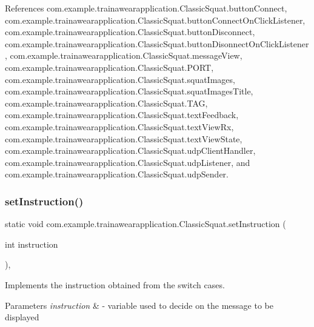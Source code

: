 References com.\+example.\+trainawearapplication.\+Classic\+Squat.\+button\+Connect, com.\+example.\+trainawearapplication.\+Classic\+Squat.\+button\+Connect\+On\+Click\+Listener, com.\+example.\+trainawearapplication.\+Classic\+Squat.\+button\+Disconnect, com.\+example.\+trainawearapplication.\+Classic\+Squat.\+button\+Disonnect\+On\+Click\+Listener, com.\+example.\+trainawearapplication.\+Classic\+Squat.\+message\+View, com.\+example.\+trainawearapplication.\+Classic\+Squat.\+P\+O\+RT, com.\+example.\+trainawearapplication.\+Classic\+Squat.\+squat\+Images, com.\+example.\+trainawearapplication.\+Classic\+Squat.\+squat\+Images\+Title, com.\+example.\+trainawearapplication.\+Classic\+Squat.\+T\+AG, com.\+example.\+trainawearapplication.\+Classic\+Squat.\+text\+Feedback, com.\+example.\+trainawearapplication.\+Classic\+Squat.\+text\+View\+Rx, com.\+example.\+trainawearapplication.\+Classic\+Squat.\+text\+View\+State, com.\+example.\+trainawearapplication.\+Classic\+Squat.\+udp\+Client\+Handler, com.\+example.\+trainawearapplication.\+Classic\+Squat.\+udp\+Listener, and com.\+example.\+trainawearapplication.\+Classic\+Squat.\+udp\+Sender.

\mbox{\label{classcom_1_1example_1_1trainawearapplication_1_1_classic_squat_a3a096fd4064cf28568fd13336c77d28f}} 
\subsubsection{\texorpdfstring{setInstruction()}{setInstruction()}}
{\footnotesize\ttfamily static void com.\+example.\+trainawearapplication.\+Classic\+Squat.\+set\+Instruction (\begin{DoxyParamCaption}\item[{int}]{instruction }\end{DoxyParamCaption})\hspace{0.3cm}{\ttfamily [inline]}, {\ttfamily [static]}}



Implements the instruction obtained from the switch cases. 


\begin{DoxyParams}{Parameters}
{\em instruction} & -\/ variable used to decide on the message to be displayed \\
\hline
\end{DoxyParams}


